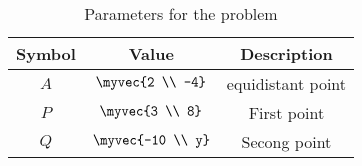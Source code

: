 \begin{table}[H]
\centering
\begin{tabular}{|c|c|c|}
\hline
\textbf{Symbol} & \textbf{Value} & \textbf{Description} \\
\hline
$A$ & $\myvec{2 \\ -4}$ & equidistant point \\
\hline
$P$ & $\myvec{3 \\ 8}$ & First point \\
\hline
$Q$ & $\myvec{-10 \\ y}$ & Secong point \\
\hline
\end{tabular}
\caption{Parameters for the problem}
\end{table}